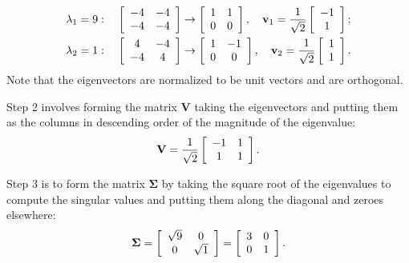 \begin{subequations}
\begin{align}
   &\lambda_1 = 9 : \quad 
   \left[ \begin{array}{c c}
   -4 & -4 	\\
   -4 & -4 	\\ \end{array} \right] \rightarrow
   \left[ \begin{array}{c c}
    1 &  1 	\\
    0 &  0 	\\ \end{array} \right] , \quad
    \mathbf{v}_1 = \frac{1}{\sqrt{2}} \left[ \begin{array}{c} -1 \\ 1 \\ \end{array} \right] ; \\
   &\lambda_2 = 1 : \quad 
   \left[ \begin{array}{c c}
    4 & -4 	\\
   -4 &  4 	\\ \end{array} \right] \rightarrow
   \left[ \begin{array}{c c}
    1 & -1 	\\
    0 &  0 	\\ \end{array} \right] , \quad
    \mathbf{v}_2 = \frac{1}{\sqrt{2}} \left[ \begin{array}{c} 1 \\ 1 \\ \end{array} \right] .
\end{align}
\end{subequations}
Note that the eigenvectors are normalized to be unit vectors and are orthogonal.

Step 2 involves forming the matrix $\mathbf{V}$ taking the eigenvectors and putting them as the columns in descending order of the magnitude of the eigenvalue:
\begin{align}
  \mathbf{V} = \frac{1}{\sqrt{2}}    \left[ \begin{array}{c c}
   -1 &  1 	\\
    1 &  1 	\\ \end{array} \right] .
\end{align}

Step 3 is to form the matrix $\boldsymbol\Sigma$ by taking the square root of the eigenvalues to compute the singular values and putting them along the diagonal and zeroes elsewhere:
\begin{align}
  \boldsymbol\Sigma = \left[ \begin{array}{c c}
   \sqrt{9} &  0 		\\
    0 		&  \sqrt{1} \\ \end{array} \right] = \left[ \begin{array}{c c}
    3	 	&  0 		\\
    0 		&  1		 \\ \end{array} \right] .
\end{align}

